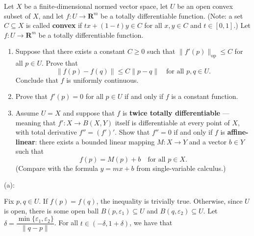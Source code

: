 \documentclass{article}
\newcommand{\R}{\mathbf{R}}
\theoremstyle{plain} %
\numberwithin{thm}{section} %
\theoremstyle{definition}
\begin{document}
    \pagebreak
    \begin{question}{25}
        Let $X$ be a finite-dimensional normed vector space, let $U$ be an open convex subset of $X$, and let $f:U\rightarrow \R^m$ be a totally differentiable function. (Note: a set $C\subseteq X$ is called \textbf{convex} if $tx+(1-t)y\in C$ for all $x,y\in C$ and $t\in [0,1]$.) Let $f:U\rightarrow \R^m$ be a totally differentiable function.

    \begin{enumerate}[label=(\alph*)]
        \item Suppose that there exists a constant $C\geq 0$ such that $\|f'(p)\|_{\mathrm{op}}\leq C$ for all $p\in U$. Prove that
            \[ \|f(p)-f(q)\| \leq C\|p-q\| \quad \text{for all $p,q\in U$.}  \]
        Conclude that $f$ is uniformly continuous.
        
        \item Prove that $f'(p)=0$ for all $p\in U$ if and only if $f$ is a constant function.

        \item Assume $U=X$ and suppose that $f$ is \textbf{twice totally differentiable} --- meaning that $f':X\rightarrow B(X,Y)$ itself is differentiable at every point of $X$, with total derivative $f''=(f')'$. Show that $f''=0$ if and only if $f$ is \textbf{affine-linear}: there exists a bounded linear mapping $M:X\rightarrow Y$ and a vector $b\in Y$ such that
            \[ f(p) = M(p) + b \quad \text{for all $p\in X$.} \]
        (Compare with the formula $y=mx+b$ from single-variable calculus.)
    \end{enumerate}
    \tcblower
    (a):

    Fix \(p,q \in U\). If \(f(p) = f(q)\), the inequality is trivially true. Otherwise, since \(U\) is open, there is some open ball \(B(p, \varepsilon _1) \subseteq U\) and \(B(q, \varepsilon _2) \subseteq U\). Let \(\delta = \dfrac{\min \{\varepsilon_1 , \varepsilon_2\}}{\|q-p\|}\). For all \(t \in (-\delta , 1 + \delta)\), we have that


\end{question}
\end{document}
